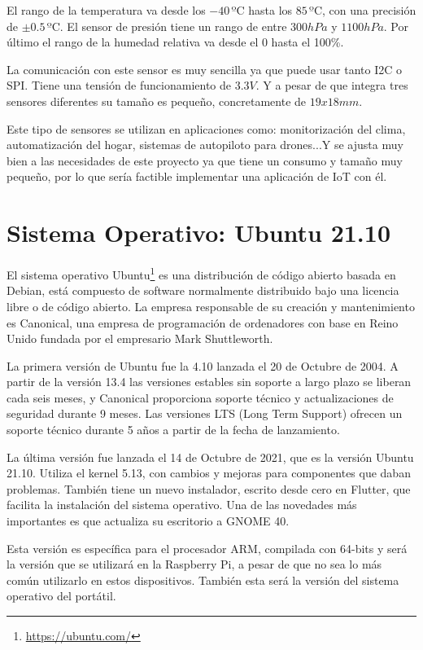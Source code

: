 \documentclass[a4paper, 12pt]{book}
\begin{document}
El rango de la temperatura va desde los $-40\, \mbox{ºC}$ hasta los $85\, \mbox{ºC}$, con una precisión de $\pm 0.5\, \mbox{ºC}$. El sensor de presión tiene un rango de entre $300 hPa$ y $1100 hPa$. Por último el rango de la humedad relativa va desde el 0 hasta el 100\%.

La comunicación con este sensor es muy sencilla ya que puede usar tanto I2C o SPI. Tiene una tensión de funcionamiento de $3.3V$. Y a pesar de que integra tres sensores diferentes su tamaño es pequeño, concretamente de $19x18 mm$.

Este tipo de sensores se utilizan en aplicaciones como: monitorización del clima, automatización del hogar, sistemas de autopiloto para drones...Y se ajusta muy bien a las necesidades de este proyecto ya que tiene un consumo y tamaño muy pequeño, por lo que sería factible implementar una aplicación de IoT con él.


\section{Sistema Operativo: Ubuntu 21.10} 
\label{sec:sistema_operativo}

El sistema operativo Ubuntu\footnote{\url{https://ubuntu.com/}} es una distribución de código abierto basada en Debian, está compuesto de software normalmente distribuido bajo una licencia libre o de código abierto. La empresa responsable de su creación y mantenimiento es Canonical, una empresa de programación de ordenadores con base en Reino Unido fundada por el empresario Mark Shuttleworth.

La primera versión de Ubuntu fue la 4.10 lanzada el 20 de Octubre de 2004. A partir de la versión 13.4 las versiones estables sin soporte a largo plazo se liberan cada seis meses, y Canonical proporciona soporte técnico y actualizaciones de seguridad durante 9 meses. Las versiones LTS (Long Term Support) ofrecen un soporte técnico durante 5 años a partir de la fecha de lanzamiento.

La última versión fue lanzada el 14 de Octubre de 2021, que es la versión Ubuntu 21.10. Utiliza el kernel 5.13, con cambios y mejoras para componentes que daban problemas. También tiene un nuevo instalador, escrito desde cero en Flutter, que facilita la instalación del sistema operativo. Una de las novedades más importantes es que actualiza su escritorio a GNOME 40. 

Esta versión es específica para el procesador ARM, compilada con 64-bits y será la versión que se utilizará en la Raspberry Pi, a pesar de que no sea lo más común utilizarlo en estos dispositivos. También esta será la versión del sistema operativo del portátil.
\end{document}
